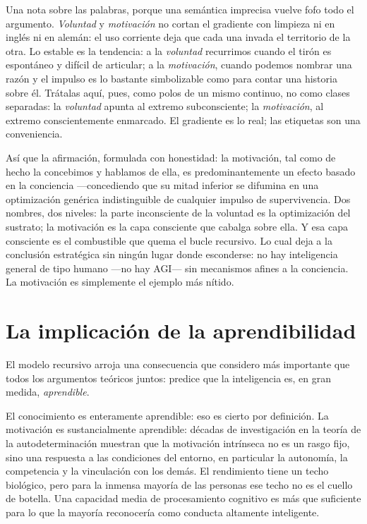 \documentclass[11pt, twoside, openright]{book}
\begin{document}
Una nota sobre las palabras, porque una semántica imprecisa vuelve fofo todo el argumento. \textit{Voluntad} y \textit{motivación} no cortan el gradiente con limpieza ni en inglés ni en alemán: el uso corriente deja que cada una invada el territorio de la otra. Lo estable es la tendencia: a la \textit{voluntad} recurrimos cuando el tirón es espontáneo y difícil de articular; a la \textit{motivación}, cuando podemos nombrar una razón y el impulso es lo bastante simbolizable como para contar una historia sobre él. Trátalas aquí, pues, como polos de un mismo continuo, no como clases separadas: la \textit{voluntad} apunta al extremo subconsciente; la \textit{motivación}, al extremo conscientemente enmarcado. El gradiente es lo real; las etiquetas son una conveniencia.

Así que la afirmación, formulada con honestidad: la motivación, tal como de hecho la concebimos y hablamos de ella, es predominantemente un efecto basado en la conciencia ---concediendo que su mitad inferior se difumina en una optimización genérica indistinguible de cualquier impulso de supervivencia. Dos nombres, dos niveles: la parte inconsciente de la voluntad es la optimización del sustrato; la motivación es la capa consciente que cabalga sobre ella. Y esa capa consciente es el combustible que quema el bucle recursivo. Lo cual deja a la conclusión estratégica sin ningún lugar donde esconderse: no hay inteligencia general de tipo humano ---no hay AGI--- sin mecanismos afines a la conciencia. La motivación es simplemente el ejemplo más nítido.

\section*{La implicación de la aprendibilidad}

El modelo recursivo arroja una consecuencia que considero más importante que todos los argumentos teóricos juntos: predice que la inteligencia es, en gran medida, \textit{aprendible}.

El conocimiento es enteramente aprendible: eso es cierto por definición. La motivación es sustancialmente aprendible: décadas de investigación en la teoría de la autodeterminación muestran que la motivación intrínseca no es un rasgo fijo, sino una respuesta a las condiciones del entorno, en particular la autonomía, la competencia y la vinculación con los demás. El rendimiento tiene un techo biológico, pero para la inmensa mayoría de las personas ese techo no es el cuello de botella. Una capacidad media de procesamiento cognitivo es más que suficiente para lo que la mayoría reconocería como conducta altamente inteligente.
\end{document}
